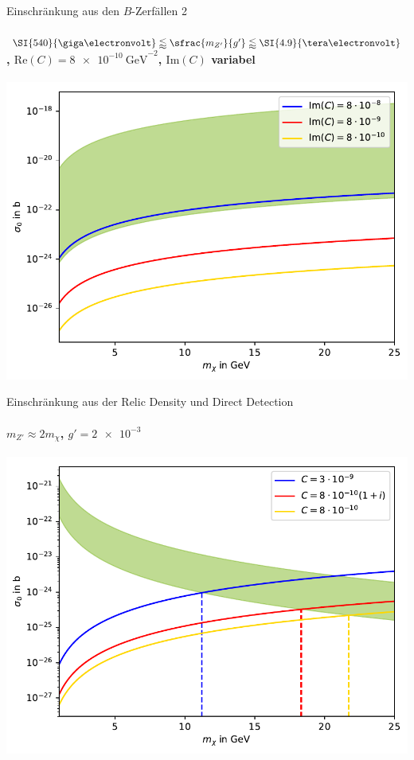 \begin{frame}{Einschränkung aus den $B$-Zerfällen 2}
\framesubtitle{$\SI{540}{\giga\electronvolt}\lessapprox\sfrac{m_{Z'}}{g'}\lessapprox\SI{4.9}{\tera\electronvolt}$, $\text{Re}(C) = \SI{8e-10}{\giga\electronvolt}^{-2}$, $\text{Im}(C)$ variabel}
\includegraphics[width=.87\textwidth]{Bilder/Im11.pdf}
\end{frame}


\begin{frame}{Einschränkung aus der Relic Density und Direct Detection}
\framesubtitle{$m_{Z'} \approx 2m_\chi$, $g'=\SI{2e-3}{}$}
\includegraphics[width=.87\textwidth]{Bilder/Relic11.pdf}
\end{frame}
